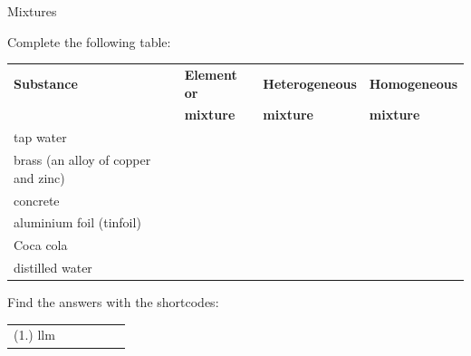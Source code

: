 \begin{exercises}{Mixtures}
{Complete the following table: \par
\begin{tabular}{|l|l|l|l|}\hline
\textbf{Substance} & \textbf{Element or} & \textbf{Heterogeneous} & \textbf{Homogeneous} \\ 
 & \textbf{mixture} & \textbf{mixture} & \textbf{mixture} \\ \hline
tap water & & & \\ \hline
brass (an alloy of copper and zinc) & & & \\ \hline
concrete & & & \\ \hline
aluminium foil (tinfoil) & & & \\ \hline
Coca cola & & & \\ \hline
distilled water & & & \\ \hline
\end{tabular}
    \label{m38708*cid3}
\par {} Find the answers with the shortcodes:
 \par \begin{tabular}[h]{cccccc}
 (1.) llm  & \end{tabular} }
\end{exercises}
